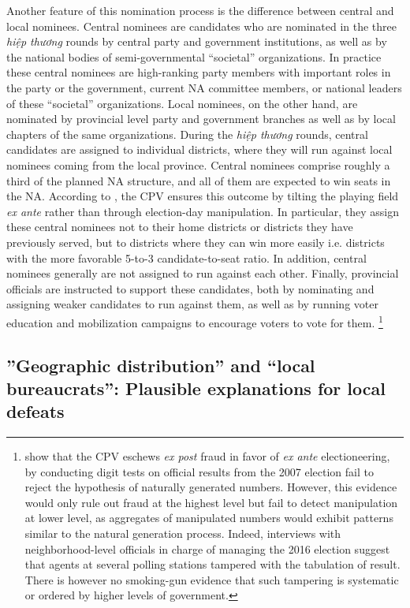 \documentclass[12pt]{article}\usepackage[]{graphicx}\usepackage[]{color}
\newcommand{\1}{\mathbbm{1}}
\begin{document}
Another feature of this nomination process is the difference between central and local nominees. Central nominees are candidates who are nominated in the three \textit{hiệp thương} rounds by central party and government institutions, as well as by the national bodies of semi-governmental ``societal'' organizations. In practice these central nominees are high-ranking party members with important roles in the party or the government, current NA committee members, or national leaders of these ``societal'' organizations. Local nominees, on the other hand, are nominated by provincial level party and government branches as well as by local chapters of the same organizations. During the \textit{hiệp thương} rounds, central candidates are assigned to individual districts, where they will run against local nominees coming from the local province. Central nominees comprise roughly a third of the planned NA structure, and all of them are expected to win seats in the NA. According to \cite{MaleskySchuler2011}, the CPV ensures this outcome by tilting the playing field \textit{ex ante} rather than through election-day manipulation. In particular, they assign these central nominees not to their home districts or districts they have previously served, but to districts where they can win more easily i.e. districts with the more favorable 5-to-3 candidate-to-seat ratio. In addition,  central nominees generally are not assigned to run against each other. Finally, provincial officials are instructed to support these candidates, both by nominating and assigning  weaker candidates to run against them, as well as by running voter education and mobilization campaigns to encourage voters to vote for them. \footnote{\cite{MaleskySchuler2011} show that the CPV eschews \textit{ex post} fraud in favor of \textit{ex ante} electioneering, by conducting digit tests on official results from the 2007 election fail to reject the hypothesis of naturally generated numbers. However, this evidence would only rule out fraud at the highest level but fail to detect manipulation at lower level, as aggregates of manipulated numbers would exhibit patterns similar to the natural generation process. Indeed, interviews with neighborhood-level officials in charge of managing the 2016 election suggest that agents at several polling stations tampered with the tabulation of result. There is however no smoking-gun evidence that such tampering is systematic or ordered by higher levels of government.}

\subsection{''Geographic distribution'' and ``local bureaucrats'': Plausible explanations for local defeats}
\end{document}
